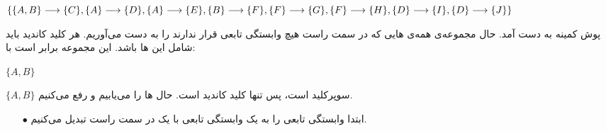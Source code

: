 \documentclass{article}
\begin{document}
\begin{itemize}
\begin{latin}
$
\{\\
\{A, B\}\longrightarrow\{C\},\\
\{A\}\longrightarrow\{D\},\\
\{A\}\longrightarrow\{E\},\\
\{B\}\longrightarrow\{F\},\\
\{F\}\longrightarrow\{G\},\\
\{F\}\longrightarrow\{H\},\\
\{D\}\longrightarrow\{I\},\\
\{D\}\longrightarrow\{J\}\\
\}
$
\end{latin}
\end{itemize}
پوش کمینه به دست آمد. حال مجموعه‌ی همه‌ی هایی که در سمت راست هیچ وابستگی تابعی قرار ندارند را به دست می‌آوریم. هر کلید کاندید باید شامل این ها باشد. این مجموعه برابر است با:
\begin{latin}
$
\{A, B\}
$
\end{latin}
$
\{A, B\}
$
سوپرکلید است، پس تنها کلید کاندید است.
\newline
حال ها را می‌یابیم و رفع می‌کنیم.
\begin{itemize}
    \item [$\bullet$] ابتدا وابستگی تابعی را به یک وابستگی تابعی با یک  در سمت راست تبدیل می‌کنیم.

\end{itemize}
\section{}
\end{document}
